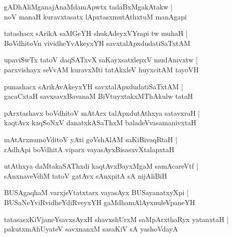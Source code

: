 \documentclass[twoside,12pt,openright]{book}
\newcounter{shloka}[chapter]
\begin{document}
\begin{shloka}%
gADhAliMganajAnaMdamApwtx tadaBxMgakAtakw |\\
noV manaH kuravxtasatx lApxtasxmutAthxtuM manAgapi
\end{shloka}

\begin{shloka}%
tatashacx sArikA saMGeYH shukAdeyxVYrapi tw muhaH |\\
BoVdhitoVn vividheYvAkeyxYH savxtalApxdudatiSaTxtAM 
\end{shloka}

\begin{shloka}%
upaviSwTx tatoV daqSATxvX saKayxsatxlepxV mudAnivxtw |\\
parxvishayx seVvAM kuravxMti tatAkxleV huyxcitAM tayoVH 
\end{shloka}

\begin{shloka}%
punashacx sArikAvAkeyxYH savxtalApxdudatiSaTxtAM |\\
gacaCxtaH savxsavxBavanaM BiVtuyxtakxMThAkulw tataH 
\end{shloka}

\begin{shloka}%
pArxtashavx boVdhitoV mAtArx talApxdutAthxya satavxraH |\\
kaqtAvx kaqSoNxV danatxkASaThxM baladeVvasamanivxtaH 
\end{shloka}

\begin{shloka}%
mAtArxnumoVditoV yAti goVshAlAM saKiBivaqRtaH |\\
rAdhApi boVdhitA viparx vayasAyxBisasxvXtalapxtaH
\end{shloka}

\begin{shloka}%
utAthxya daMtakaSAThxdi kaqtAvxBayxMgaM samAcareVtf |\\
sAnxnaveVdiM tatoV gatAvx sAnxpitA sA nijAliBiH 
\end{shloka}

\begin{shloka}%
BUSAgaqhaM varxjeVtatxtarx vayasAyx BUSayanatxyXpi |\\
BUSaNeYviRvidheYdiRveyxYH gaMdhamAlAyxnuleVpaneYH
\end{shloka}

\begin{shloka}%
tatasasxKiVjaneYsavxsAyxH shavxshUrxM saMpArxthaRyx yatanxtaH |\\
pakutxmAhUyateV savxnanxM sasaKiV sA yashoVdayA 
\end{shloka}
\end{document}

